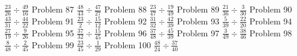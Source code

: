 \documentclass{article}
\begin{document}
\newline
\hfill \break
$\displaystyle \frac{23}{26} \div \frac{49}{16}$
\newline
\hfill \break
Problem 87
\newline
\hfill \break
$\displaystyle \frac{48}{43} \div \frac{47}{27}$
\newline
\hfill \break
Problem 88
\newline
\hfill \break
$\displaystyle \frac{23}{47} \div \frac{19}{49}$
\newline
\hfill \break
Problem 89
\newline
\hfill \break
$\displaystyle \frac{21}{36} \div \frac{3}{30}$
\newline
\hfill \break
Problem 90
\newline
\hfill \break
$\displaystyle \frac{43}{31} \div \frac{44}{22}$
\newline
\hfill \break
Problem 91
\newline
\hfill \break
$\displaystyle \frac{23}{2} \div \frac{15}{12}$
\newline
\hfill \break
Problem 92
\newline
\hfill \break
$\displaystyle \frac{31}{32} \div \frac{42}{39}$
\newline
\hfill \break
Problem 93
\newline
\hfill \break
$\displaystyle \frac{5}{39} \div \frac{22}{20}$
\newline
\hfill \break
Problem 94
\newline
\hfill \break
$\displaystyle \frac{27}{19} \div \frac{9}{26}$
\newline
\hfill \break
Problem 95
\newline
\hfill \break
$\displaystyle \frac{37}{32} \div \frac{15}{45}$
\newline
\hfill \break
Problem 96
\newline
\hfill \break
$\displaystyle \frac{37}{48} \div \frac{45}{39}$
\newline
\hfill \break
Problem 97
\newline
\hfill \break
$\displaystyle \frac{3}{49} \div \frac{38}{46}$
\newline
\hfill \break
Problem 98
\newline
\hfill \break
$\displaystyle \frac{8}{48} \div \frac{2}{45}$
\newline
\hfill \break
Problem 99
\newline
\hfill \break
$\displaystyle \frac{23}{45} \div \frac{1}{29}$
\newline
\hfill \break
Problem 100
\newline
\hfill \break
$\displaystyle \frac{48}{24} \div \frac{37}{40}$
\newline
\hfill \break
\end{document}
